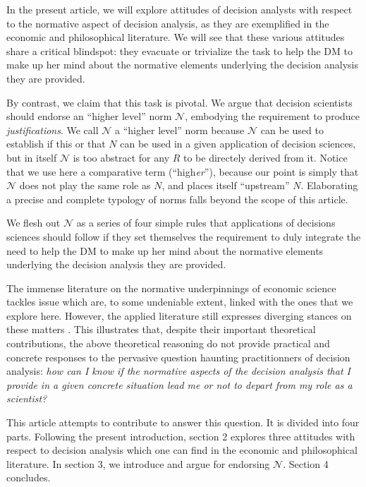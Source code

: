 \documentclass[preprint, french, english, 11pt, authoryear]{elsarticle}%
\newcommand{\adv}{\mathscr{N}}
\begin{document}
In the present article, we will explore attitudes of decision analysts with respect to the normative aspect of decision analysis, as they are exemplified in the economic and philosophical literature. We will see that these various attitudes share a critical blindspot: they evacuate or trivialize the task to help the \ac{DM} to make up her mind about the normative elements underlying the decision analysis they are provided.

By contrast, we claim that this task is pivotal. We argue that decision scientists should endorse an “higher level” norm $\adv$, embodying the requirement to produce \emph{justifications}. We call $\adv$ a “higher level” norm because $\adv$ can be used to establish if this or that $N$ can be used in a given application of decision sciences, but in itself $\adv$ is too abstract for any $R$ to be directely derived from it. Notice that we use here a comparative term (“high\emph{er}”), because our point is simply that $\adv$ does not play the same role as $N$, and places itself “upstream” $N$. Elaborating a precise and complete typology of norms falls beyond the scope of this article.

We flesh out $\adv$ as a series of four simple rules that applications of decisions sciences should follow if they set themselves the requirement to duly integrate the need to help the \ac{DM} to make up her mind about the normative elements underlying the decision analysis they are provided. 

The immense literature on the normative underpinnings of economic science \citep{buchanan_positive_1959,sen_nature_1967,dwyer_scientific_1985, heath_value_1994,sen_rationality_2004,mongin_value_2006,sen_idea_2009,baujard_value_2013} tackles issue which are, to some undeniable extent, linked with the ones that we explore here. However, the applied literature still expresses diverging stances on these matters \citep{spash_bulldozing_2015, scharks_dont_2016}. This illustrates that, despite their important theoretical contributions, the above theoretical reasoning do not provide practical and concrete responses to the pervasive question haunting practitionners of decision analysis: \emph{how can I know if the normative aspects of the decision analysis that I provide in a given concrete situation lead me or not to depart from my role as a scientist?}

This article attempts to contribute to answer this question. It is divided into four parts. Following the present introduction, section 2 explores three attitudes with respect to decision analysis which one can find in the economic and philosophical literature. In section 3, we introduce and argue for endorsing $\adv$. Section 4 concludes.
\end{document}
